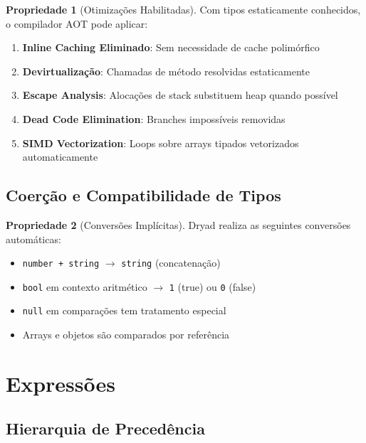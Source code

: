 \documentclass[12pt,a4paper]{article}
\theoremstyle{definition}
\newtheorem{property}{Propriedade}[section]
\begin{document}
\begin{property}[Otimizações Habilitadas]
Com tipos estaticamente conhecidos, o compilador AOT pode aplicar:
\begin{enumerate}
    \item \textbf{Inline Caching Eliminado}: Sem necessidade de cache polimórfico
    \item \textbf{Devirtualização}: Chamadas de método resolvidas estaticamente
    \item \textbf{Escape Analysis}: Alocações de stack substituem heap quando possível
    \item \textbf{Dead Code Elimination}: Branches impossíveis removidas
    \item \textbf{SIMD Vectorization}: Loops sobre arrays tipados vetorizados automaticamente
\end{enumerate}
\end{property}

\subsection{Coerção e Compatibilidade de Tipos}

\begin{property}[Conversões Implícitas]
Dryad realiza as seguintes conversões automáticas:
\begin{itemize}
    \item \texttt{number + string} $\rightarrow$ \texttt{string} (concatenação)
    \item \texttt{bool} em contexto aritmético $\rightarrow$ \texttt{1} (true) ou \texttt{0} (false)
    \item \texttt{null} em comparações tem tratamento especial
    \item Arrays e objetos são comparados por referência
\end{itemize}
\end{property}

\section{Expressões}

\subsection{Hierarquia de Precedência}
\end{document}
